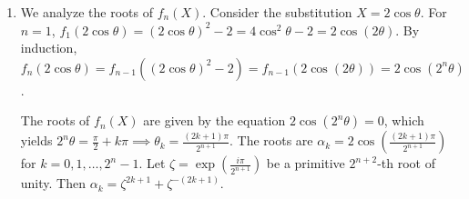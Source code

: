 \documentclass{article}
\begin{document}
\begin{enumerate}[label=\fbox{\arabic*}]
        \textbf{Case 2: At least one of $z_1, z_2$ is non-real.}
        Without loss of generality, suppose $z_1 \notin \mathbb{R}$. Then $z_1$ generates $\mathbb{C}$ over $\mathbb{R}$. The minimal polynomial of $z_1$ over $\mathbb{R}$ is an irreducible quadratic $X^2 + aX + b \in \mathbb{R}[X]$. Thus, $X^2 + aX + b \in M$.
        Since $\mathbb{R}[z_1] \cong \mathbb{C}$, the field generated by both elements is $\mathbb{R}[z_1, z_2] = \mathbb{C}$. Because $z_1$ already generates the whole extension, $z_2$ must be an element of $\mathbb{R}[z_1]$.
        Since the degree of the extension is 2, $z_2$ can be written uniquely as an $\mathbb{R}$-linear combination of $1$ and $z_1$:
        $z_2 = c' z_1 + d'$ for some $c', d' \in \mathbb{R}$.
        This implies $Y - c' X - d' \in M$. Let $c = -c'$ and $d = -d'$, giving $Y + cX + d \in M$.
        The ideal $I = (X^2 + aX + b, Y + cX + d)$ is contained in $M$. Since $\mathbb{R}[X, Y]/I \cong \mathbb{R}[X]/(X^2 + aX + b) \cong \mathbb{C}$ is a field, $I$ is maximal, so $M = I$. This matches the second form.
        
        \textbf{Case 3: $z_2 \notin \mathbb{R}$.}
        By a completely symmetric argument, $z_2$ has a minimal quadratic polynomial $Y^2 + cY + d \in M$, and $z_1$ can be expressed as $a' z_2 + b'$. Letting $a = -a'$ and $b = -b'$, we find $M = (X + aY + b, Y^2 + cY + d)$. This matches the third form.
        
        Since any point $(z_1, z_2) \in \mathbb{C}^2$ falls into one of these cases, every maximal ideal of $\mathbb{R}[X, Y]$ takes one of the three stated forms.

  \item %
        We analyze the roots of $f_n(X)$. Consider the substitution $X = 2 \cos \theta$. 
        For $n=1$, $f_1(2 \cos \theta) = (2 \cos \theta)^2 - 2 = 4 \cos^2 \theta - 2 = 2 \cos(2\theta)$.
        By induction, $f_n(2 \cos \theta) = f_{n-1}((2 \cos \theta)^2 - 2) = f_{n-1}(2 \cos(2\theta)) = 2 \cos(2^n \theta)$.
        
        The roots of $f_n(X)$ are given by the equation $2 \cos(2^n \theta) = 0$, which yields
        $2^n \theta = \frac{\pi}{2} + k\pi \implies \theta_k = \frac{(2k+1)\pi}{2^{n+1}}$.
        The roots are $\alpha_k = 2 \cos \left( \frac{(2k+1)\pi}{2^{n+1}} \right)$ for $k = 0, 1, \dots, 2^n - 1$.
        Let $\zeta = \exp\left(\frac{i\pi}{2^{n+1}}\right)$ be a primitive $2^{n+2}$-th root of unity. Then $\alpha_k = \zeta^{2k+1} + \zeta^{-(2k+1)}$.
        

\end{enumerate}
\end{document}
